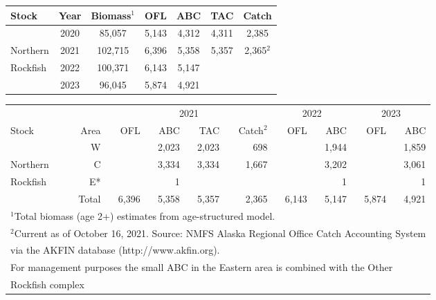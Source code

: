 \documentclass[
  11pt,
]{article}
\begin{document}
\begin{center}
\begin{tabular}{lcccccc}
\hline

Stock & Year & Biomass$^1$ & OFL & ABC & TAC & Catch \\
\hline

         & 2020 & 85,057  & 5,143 & 4,312 & 4,311 & 2,385\\
Northern & 2021 & 102,715 & 6,396 & 5,358 & 5,357 & 2,365$^2$\\
Rockfish & 2022 & 100,371 & 6,143 & 5,147 & & \\
         & 2023 & 96,045  & 5,874 & 4,921 & & \\
\hline
\end{tabular}
\end{center}

\begin{center}
\begin{tabular}{lrrrrrrrrr}
\hline
          &           & \multicolumn{4}{c}{2021} & \multicolumn{2}{c}{2022} & \multicolumn{2}{c}{2023}  \\ 
Stock     & Area      & OFL   & ABC   & TAC   & Catch$^2$ & OFL   & ABC   & OFL    & ABC   \\
\hline
          & W         &       & 2,023 & 2,023  & 698       &       & 1,944 &        & 1,859 \\
Northern  & C         &       & 3,334 & 3,334  & 1,667     &       & 3,202 &        & 3,061 \\
Rockfish  & E*        &       &     1 &        &           &       & 1     &        & 1     \\
          & Total     & 6,396 & 5,358 & 5,357  & 2,365     & 6,143 & 5,147 & 5,874  & 4,921 \\     
     
\hline
\multicolumn{10}{l}{\footnotesize $^1$Total biomass (age 2+) estimates from age-structured model.} \\
\multicolumn{10}{l}{\footnotesize $^2$Current as of October 16, 2021. Source: NMFS Alaska Regional Office Catch Accounting System} \\
\multicolumn{10}{l}{\footnotesize via the AKFIN database (http://www.akfin.org).} \\
\multicolumn{10}{l}{\footnotesize *For management purposes the small ABC in the Eastern area is combined with the Other} \\
\multicolumn{10}{l}{\footnotesize Rockfish complex} \\
\end{tabular}
\end{center}
\end{document}
